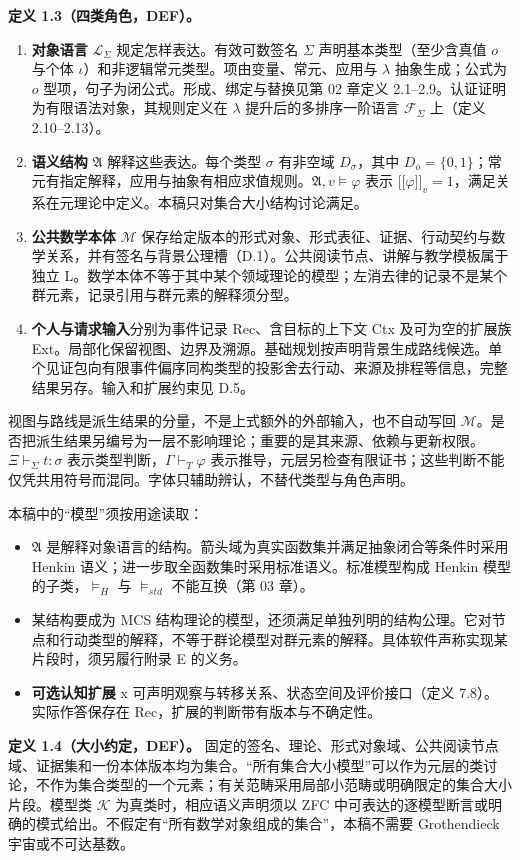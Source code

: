 \documentclass[UTF8,a4paper,zihao=-4,fontset=windows,openany]{ctexbook}
\def\mathrm#1{#1}%
\providecommand{\llbracket}{\mathopen{[\![}}
\providecommand{\rrbracket}{\mathclose{]\!]}}
\begin{document}
\textbf{定义 1.3（四类角色，DEF）。}

\begin{enumerate}
\item \textbf{对象语言} \(\mathcal L_\Sigma\) 规定怎样表达。有效可数签名 \(\Sigma\) 声明基本类型（至少含真值 \(o\) 与个体 \(\iota\)）和非逻辑常元类型。项由变量、常元、应用与 \(\lambda\) 抽象生成；公式为 \(o\) 型项，句子为闭公式。形成、绑定与替换见第 02 章定义 2.1–2.9。认证证明为有限语法对象，其规则定义在 \(\lambda\) 提升后的多排序一阶语言 \(\mathcal F_\Sigma\) 上（定义 2.10–2.13）。
\item \textbf{语义结构} \(\mathfrak A\) 解释这些表达。每个类型 \(\sigma\) 有非空域 \(D_\sigma\)，其中 \(D_o=\{0,1\}\)；常元有指定解释，应用与抽象有相应求值规则。\(\mathfrak A,v\models\varphi\) 表示 \(\llbracket\varphi\rrbracket_v=1\)，满足关系在元理论中定义。本稿只对集合大小结构讨论满足。
\item \textbf{公共数学本体} \(\mathcal M\) 保存给定版本的形式对象、形式表征、证据、行动契约与数学关系，并有签名与背景公理槽（D.1）。公共阅读节点、讲解与教学模板属于独立 L。数学本体不等于其中某个领域理论的模型；左消去律的记录不是某个群元素，记录引用与群元素的解释须分型。
\item \textbf{个人与请求输入}分别为事件记录 Rec、含目标的上下文 Ctx 及可为空的扩展族 Ext。局部化保留视图、边界及溯源。基础规划按声明背景生成路线候选。单个见证包向有限事件偏序同构类型的投影舍去行动、来源及排程等信息，完整结果另存。输入和扩展约束见 D.5。
\end{enumerate}
视图与路线是派生结果的分量，不是上式额外的外部输入，也不自动写回 \(\mathcal M\)。是否把派生结果另编号为一层不影响理论；重要的是其来源、依赖与更新权限。\(\Xi\vdash_\Sigma t:\sigma\) 表示类型判断，\(\Gamma\vdash_T\varphi\) 表示推导，元层另检查有限证书；这些判断不能仅凭共用符号而混同。字体只辅助辨认，不替代类型与角色声明。

本稿中的“模型”须按用途读取：

\begin{itemize}
\item \(\mathfrak A\) 是解释对象语言的结构。箭头域为真实函数集并满足抽象闭合等条件时采用 Henkin 语义；进一步取全函数集时采用标准语义。标准模型构成 Henkin 模型的子类，\(\models_H\) 与 \(\models_{\mathrm{std}}\) 不能互换（第 03 章）。
\item 某结构要成为 MCS 结构理论的模型，还须满足单独列明的结构公理。它对节点和行动类型的解释，不等于群论模型对群元素的解释。具体软件声称实现某片段时，须另履行附录 E 的义务。
\item \textbf{可选认知扩展} x 可声明观察与转移关系、状态空间及评价接口（定义 7.8）。实际作答保存在 Rec，扩展的判断带有版本与不确定性。
\end{itemize}
\textbf{定义 1.4（大小约定，DEF）。} 固定的签名、理论、形式对象域、公共阅读节点域、证据集和一份本体版本均为集合。“所有集合大小模型”可以作为元层的类讨论，不作为集合类型的一个元素；有关范畴采用局部小范畴或明确限定的集合大小片段。模型类 \(\mathcal K\) 为真类时，相应语义声明须以 ZFC 中可表达的逐模型断言或明确的模式给出。不假定有“所有数学对象组成的集合”，本稿不需要 Grothendieck 宇宙或不可达基数。
\end{document}
